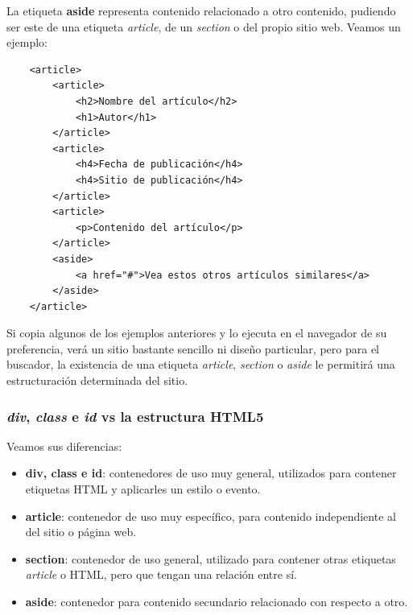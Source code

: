 La etiqueta \textbf{aside} representa contenido relacionado a otro contenido, pudiendo ser este de una etiqueta \textit{article}, de un \textit{section} o del propio sitio web. Veamos un ejemplo:
\begin{lstlisting}
    <article>
        <article>
            <h2>Nombre del artículo</h2>
            <h1>Autor</h1>
        </article>
        <article>
            <h4>Fecha de publicación</h4>
            <h4>Sitio de publicación</h4>
        </article>
        <article>
            <p>Contenido del artículo</p>
        </article>
        <aside>
            <a href="#">Vea estos otros artículos similares</a>
        </aside>
    </article>
\end{lstlisting}

Si copia algunos de los ejemplos anteriores y lo ejecuta en el navegador de su preferencia, verá un sitio bastante sencillo ni diseño particular, pero para el buscador, la existencia de una etiqueta \textit{article}, \textit{section} o \textit{aside} le permitirá una estructuración determinada del sitio.


\subsubsection{\textit{div}, \textit{class} e \textit{id} vs la estructura HTML5}
\hspace{0.55cm}Veamos sus diferencias:
\begin{itemize}
    \item \textbf{div, class e id}: contenedores de uso muy general, utilizados para contener etiquetas HTML y aplicarles un estilo o evento.
    \item \textbf{article}: contenedor de uso muy específico, para contenido independiente al del sitio o página web.
    \item \textbf{section}: contenedor de uso general, utilizado para contener otras etiquetas \textit{article} o HTML, pero que tengan una relación entre sí.
    \item \textbf{aside}: contenedor para contenido secundario relacionado con respecto a otro.
\end{itemize}